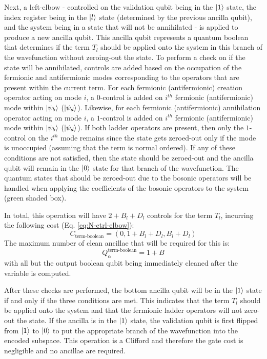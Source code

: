 Next, a left-elbow - controlled on the validation qubit being in the $\ket{1}$ state, the index register being in the $\ket{l}$ state (determined by the previous ancilla qubit), and the system being in a state that will not be annihilated - is applied to produce a new ancilla qubit.
This ancilla qubit represents a quantum boolean that determines if the term $T_l$ should be applied onto the system in this branch of the wavefunction without zeroing-out the state.
To perform a check on if the state will be annihilated, controls are added based on the occupation of the fermionic and antifermionic modes corresponding to the operators that are present within the current term.
For each fermionic (antifermionic) creation operator acting on mode $i$, a $0$-control is added on $i^{th}$ fermionic (antifermionic) mode within $\ket{\psi_b}$ ($\ket{\psi_d}$).
Likewise, for each fermionic (antifermionic) annihilation operator acting on mode $i$, a $1$-control is added on $i^{th}$ fermionic (antifermionic) mode within $\ket{\psi_b}$ ($\ket{\psi_d}$).
If both ladder operators are present, then only the $1$-control on the $i^{th}$ mode remains since the state gets zeroed-out only if the mode is unoccupied (assuming that the term is normal ordered).
If any of these conditions are not satisfied, then the state should be zeroed-out and the ancilla qubit will remain in the $\ket{0}$ state for that branch of the wavefunction.
The quantum states that should be zeroed-out due to the bosonic operators will be handled when applying the coefficients of the bosonic operators to the system (green shaded box).

In total, this operation will have $2 + B_l + D_l$ controls for the term $T_l$, incurring the following cost (Eq. \ref{eq:N-ctrl-elbow}):
\begin{equation}
    C_{\text{term-boolean}} = (0, 1 + B_l + D_l, B_l + D_l)
\end{equation}
The maximum number of clean ancillae that will be required for this is:
\begin{equation}
    Q_\alpha^{\text{term-boolean}} = 1 + B
\end{equation}
with all but the output boolean qubit being immediately cleaned after the variable is computed.

After these checks are performed, the bottom ancilla qubit will be in the $\ket{1}$ state if and only if the three conditions are met.
This indicates that the term $T_l$ should be applied onto the system and that the fermionic ladder operators will not zero-out the state.
If the ancilla is in the $\ket{1}$ state, the validation qubit is first flipped from $\ket{1}$ to $\ket{0}$ to put the appropriate branch of the wavefunction into the encoded subspace.
This operation is a Clifford and therefore the gate cost is negligible and no ancillae are required.

